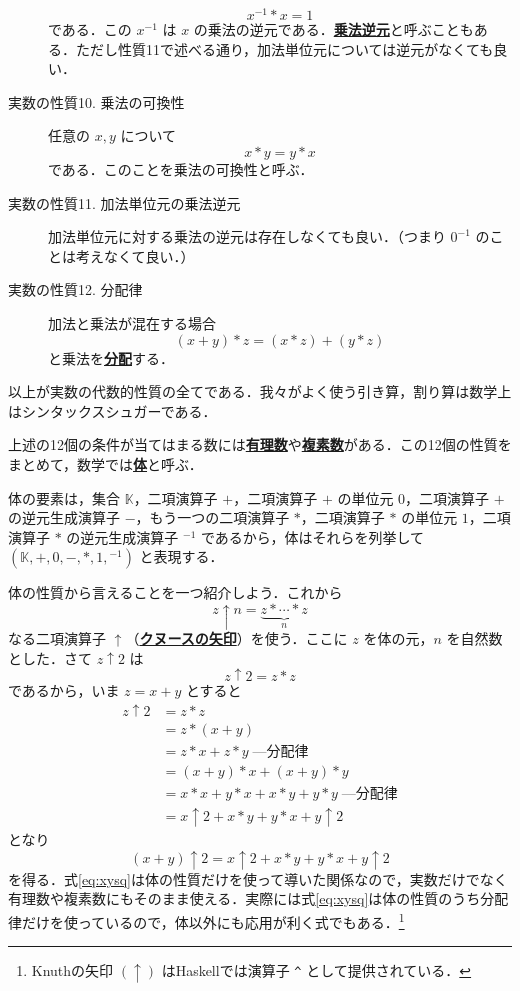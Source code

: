 \documentclass[a4paper,twocolumn]{jsbook}
\newcommand{\programminglanguage}[1]{\textsf{#1}}
\newcommand{\haskell}{\programminglanguage{Haskell}}
\newcommand{\keyword}[1]{{\underline{\textbf{#1}}}}
\newcommand{\code}[1]{\texttt{#1}}
\newcommand{\mSpecialSet}[1]{\mathbb{#1}} %
\newcommand{\mKSet}{\mSpecialSet{K}}
\newcommand{\mTupleWith}[1]{\left(#1\right)}
\begin{document}
\begin{description}
\begin{equation}
x^{-1}*x=1
\end{equation}
である．この $x^{-1}$ は $x$ の乗法の逆元である．\keyword{乗法逆元}と呼ぶこともある．ただし性質11で述べる通り，加法単位元については逆元がなくても良い．
\item[実数の性質10. 乗法の可換性] 任意の $x,y$ について
\begin{equation}
x*y=y*x
\end{equation}
である．このことを乗法の可換性と呼ぶ．
\item[実数の性質11. 加法単位元の乗法逆元] 加法単位元に対する乗法の逆元は存在しなくても良い．（つまり $0^{-1}$ のことは考えなくて良い．）
\item[実数の性質12. 分配律] 加法と乗法が混在する場合
\begin{equation}
(x+y)*z=(x*z)+(y*z)
\end{equation}
と乗法を\keyword{分配}する．
\end{description}
以上が実数の代数的性質の全てである．我々がよく使う引き算，割り算は数学上はシンタックスシュガーである．

上述の12個の条件が当てはまる数には\keyword{有理数}や\keyword{複素数}がある．この12個の性質をまとめて，数学では\keyword{体}と呼ぶ．

体の要素は，集合 $\mKSet$，二項演算子 $+$，二項演算子 $+$ の単位元 $0$，二項演算子 $+$ の逆元生成演算子 $-$，もう一つの二項演算子 $*$，二項演算子 $*$ の単位元 $1$，二項演算子 $*$ の逆元生成演算子 ${}^{-1}$ であるから，体はそれらを列挙して $\mTupleWith{\mKSet,+,0,-,*,1,{}^{-1}}$ と表現する．

体の性質から言えることを一つ紹介しよう．これから
\begin{equation}
z\uparrow n=\underbrace{z*\dotsb*z}_n
\end{equation}
なる二項演算子 $\uparrow$（\keyword{クヌースの矢印}）を使う．ここに $z$ を体の元，$n$ を自然数とした．さて $z\uparrow2$ は
\begin{equation}
z\uparrow2=z*z
\end{equation}
であるから，いま $z=x+y$ とすると
\begin{align}
z\uparrow2&=z*z\\
&=z*(x+y)\\
&=z*x+z*y\;\text{---分配律}\\
&=(x+y)*x+(x+y)*y\\
&=x*x+y*x+x*y+y*y\;\text{---分配律}\\
&=x\uparrow2+x*y+y*x+y\uparrow2
\end{align}
となり
\begin{equation}
\label{eq:xysq}
(x+y)\uparrow2=x\uparrow2+x*y+y*x+y\uparrow2
\end{equation}
を得る．式\eqref{eq:xysq}は体の性質だけを使って導いた関係なので，実数だけでなく有理数や複素数にもそのまま使える．実際には式\eqref{eq:xysq}は体の性質のうち分配律だけを使っているので，体以外にも応用が利く式でもある．\footnote{Knuthの矢印 $(\uparrow)$ は\haskell では演算子 \code{\^} として提供されている．}
\end{document}
